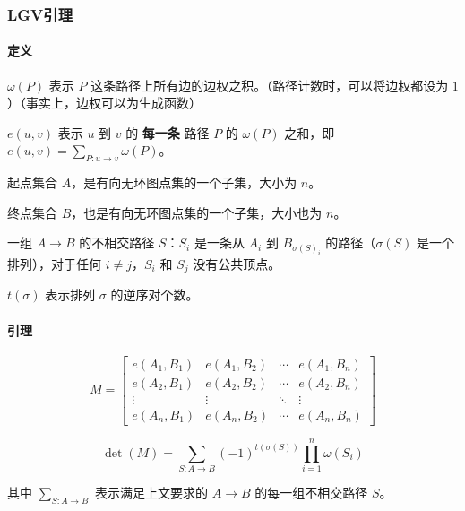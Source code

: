 \subsubsection{LGV引理}

\paragraph{定义}

$\omega(P)$ 表示 $P$ 这条路径上所有边的边权之积。（路径计数时，可以将边权都设为 $1$）（事实上，边权可以为生成函数）

$e(u, v)$ 表示 $u$ 到 $v$ 的 \textbf{每一条} 路径 $P$ 的 $\omega(P)$ 之和，即 $e(u, v)=\sum\limits_{P:u\rightarrow v}\omega(P)$。

起点集合 $A$，是有向无环图点集的一个子集，大小为 $n$。

终点集合 $B$，也是有向无环图点集的一个子集，大小也为 $n$。

一组 $A\rightarrow B$ 的不相交路径 $S$：$S_i$ 是一条从 $A_i$ 到 $B_{\sigma(S)_i}$ 的路径（$\sigma(S)$ 是一个排列），对于任何 $i\ne j$，$S_i$ 和 $S_j$ 没有公共顶点。

$t(\sigma)$ 表示排列 $\sigma$ 的逆序对个数。

\paragraph{引理}

$$
M = \begin{bmatrix}e(A_1,B_1)&e(A_1,B_2)&\cdots&e(A_1,B_n)\\
e(A_2,B_1)&e(A_2,B_2)&\cdots&e(A_2,B_n)\\
\vdots&\vdots&\ddots&\vdots\\
e(A_n,B_1)&e(A_n,B_2)&\cdots&e(A_n,B_n)\end{bmatrix}
$$

$$
\det(M)=\sum\limits_{S:A\rightarrow B}(-1)^{t(\sigma(S))}\prod\limits_{i=1}^n \omega(S_i)
$$

其中 $\sum\limits_{S:A\rightarrow B}$ 表示满足上文要求的 $A\rightarrow B$ 的每一组不相交路径 $S$。